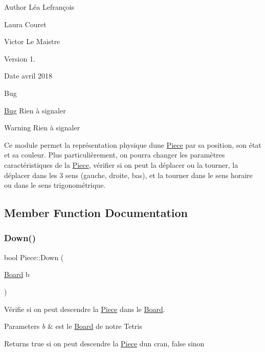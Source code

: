 \begin{DoxyAuthor}{Author}
Léa Lefrançois 

Laura Couret 

Victor Le Maistre 
\end{DoxyAuthor}
\begin{DoxyVersion}{Version}
1. 
\end{DoxyVersion}
\begin{DoxyDate}{Date}
avril 2018 
\end{DoxyDate}
\begin{DoxyRefDesc}{Bug}
\item[\hyperlink{bug__bug000010}{Bug}]Rien à signaler \end{DoxyRefDesc}
\begin{DoxyWarning}{Warning}
Rien à signaler
\end{DoxyWarning}
Ce module permet la représentation physique d\textquotesingle{}une \hyperlink{classPiece}{Piece} par sa position, son état et sa couleur. Plus particulièrement, on pourra changer les paramètres caractéristiques de la \hyperlink{classPiece}{Piece}, vérifier si on peut la déplacer ou la tourner, la déplacer dans les 3 sens (gauche, droite, bas), et la tourner dans le sens horaire ou dans le sens trigonométrique. 

\subsection{Member Function Documentation}
\mbox{\label{classPiece_ad48708c0bbee0b0a583f00e56808b1d2}} 
\subsubsection{\texorpdfstring{Down()}{Down()}}
{\footnotesize\ttfamily bool Piece\+::\+Down (\begin{DoxyParamCaption}\item[{\hyperlink{classBoard}{Board}}]{b }\end{DoxyParamCaption})}



Vérifie si on peut descendre la \hyperlink{classPiece}{Piece} dans le \hyperlink{classBoard}{Board}. 


\begin{DoxyParams}{Parameters}
{\em b} & est le \hyperlink{classBoard}{Board} de notre Tetris \\
\hline
\end{DoxyParams}
\begin{DoxyReturn}{Returns}
true si on peut descendre la \hyperlink{classPiece}{Piece} d\textquotesingle{}un cran, false sinon 
\end{DoxyReturn}
\mbox{\label{classPiece_aa5f13b2ce17fdf29dca28b0455f7b73a}} 
